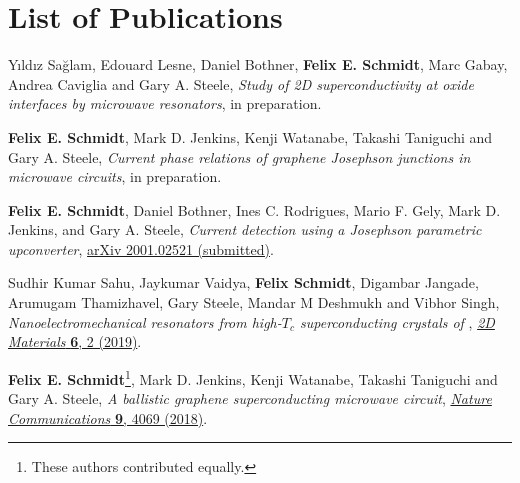 \chapter*{List of Publications}
\label{publications}

\renewcommand*{\thefootnote}{\fnsymbol{footnote}}
\setcounter{footnote}{0}

\begin{etaremune}{\small

\item Yıldız Sağlam, Edouard Lesne, Daniel Bothner, \textbf{Felix E. Schmidt}, Marc Gabay, Andrea Caviglia and Gary A. Steele, \textit{Study of 2D superconductivity at oxide interfaces by microwave resonators}, in preparation.

\item \textbf{Felix E. Schmidt}, Mark D. Jenkins, Kenji Watanabe, Takashi Taniguchi and Gary A. Steele, \textit{Current phase relations of graphene Josephson junctions in microwave circuits}, in preparation.

\item \textbf{Felix E. Schmidt}, Daniel Bothner, Ines C. Rodrigues, Mario F. Gely, Mark D. Jenkins, and Gary A. Steele, \textit{Current detection using a Josephson parametric upconverter}, \href{https://arxiv.org/abs/2001.02521}{arXiv 2001.02521 (submitted)}.

\item Sudhir Kumar Sahu, Jaykumar Vaidya, \textbf{Felix Schmidt}, Digambar Jangade, Arumugam Thamizhavel, Gary Steele, Mandar M Deshmukh and Vibhor Singh, \textit{Nanoelectromechanical resonators from high-$T_c$ superconducting crystals of }, \href{https://doi.org/10.1088/2053-1583/ab0800}{\textit{2D Materials} \textbf{6}, 2 (2019)}.

\item \textbf{Felix E. Schmidt}\footnote{\label{foot:equal}These authors contributed equally.}, Mark D. Jenkins, Kenji Watanabe, Takashi Taniguchi and Gary A. Steele, \textit{A ballistic graphene superconducting microwave circuit}, \href{https://doi.org/10.1038/s41467-018-06595-2}{\textit{Nature Communications} \textbf{9}, 4069 (2018)}.

}\end{etaremune}

\renewcommand*{\thefootnote}{\arabic{footnote}}
